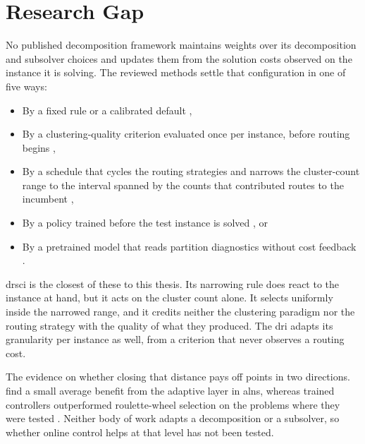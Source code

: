\section{Research Gap}\label{sec:lit-gap}

No published decomposition framework maintains weights over its decomposition and subsolver choices and updates them from the solution costs observed on the instance it is solving. The reviewed methods settle that configuration in one of five ways:
\begin{itemize}
  \item By a fixed rule or a calibrated default \citep{queirogaPOPMUSICMatheuristic2021,santiniDecompositionStrategiesVehicle2023,parallel_taillard_1993},
  \item By a clustering-quality criterion evaluated once per instance, before routing begins \citep{kerscherDecomposerouteimproveFrameworkSolving2025},
  \item By a schedule that cycles the routing strategies and narrows the cluster-count range to the interval spanned by the counts that contributed routes to the incumbent \citep{kerscherSolvingHeterogeneousVehicle},
  \item By a policy trained before the test instance is solved \citep{houGeneralizeLearnedHeuristics2023,liLearningDelegate2021,yeGLOP2024}, or
  \item By a pretrained model that reads partition diagnostics without cost feedback \citep{karaahmetogluAdaptiveClusterFirst2026}.
\end{itemize}

\gls{drsci} \citep{kerscherSolvingHeterogeneousVehicle} is the closest of these to this thesis. Its narrowing rule does react to the instance at hand, but it acts on the cluster count alone. It selects uniformly inside the narrowed range, and it credits neither the clustering paradigm nor the routing strategy with the quality of what they produced. The \gls{dri} \citep{kerscherDecomposerouteimproveFrameworkSolving2025} adapts its granularity per instance as well, from a criterion that never observes a routing cost.

The evidence on whether closing that distance pays off points in two directions. \citet{turkes2021meta} find a small average benefit from the adaptive layer in \gls{alns}, whereas trained controllers outperformed roulette-wheel selection on the problems where they were tested \citep{kallestad2023general}. Neither body of work adapts a decomposition or a subsolver, so whether online control helps at that level has not been tested.

